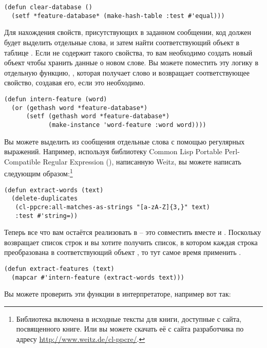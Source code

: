 \begin{lstlisting}
(defun clear-database ()
  (setf *feature-database* (make-hash-table :test #'equal)))
\end{lstlisting}

Для нахождения свойств, присутствующих в заданном сообщении, код должен будет выделить
отдельные слова, и затем найти соответствующий объект  в таблице
.  Если  не содержит такого свойства, то вам
необходимо создать новый объект  чтобы хранить данные о новом слове.  Вы
можете поместить эту логику в отдельную функцию, , которая получает
слово и возвращает соответствующее свойство, создавая его, если это необходимо.

\begin{lstlisting}
(defun intern-feature (word)
  (or (gethash word *feature-database*)
      (setf (gethash word *feature-database*)
            (make-instance 'word-feature :word word))))
\end{lstlisting}

Вы можете выделить из сообщения отдельные слова с помощью регулярных выражений.  Например,
используя библиотеку Common Lisp Portable Perl-Compatible Regular Expression
(), написанную Weitz, вы можете написать  следующим
образом:\footnote{Библиотека  включена в исходные тексты для книги,
  доступные с сайта, посвященного книге.  Или вы можете скачать её с сайта разработчика по
  адресу \url{http://www.weitz.de/cl-ppcre/}.}

\begin{lstlisting}
(defun extract-words (text)
  (delete-duplicates
   (cl-ppcre:all-matches-as-strings "[a-zA-Z]{3,}" text)
   :test #'string=))
\end{lstlisting}

Теперь все что вам остаётся реализовать в  -- это совместить вместе
 и .  Поскольку  возвращает
список строк и вы хотите получить список, в котором каждая строка преобразована в
соответствующий объект , то тут самое время применить .

\begin{lstlisting}
(defun extract-features (text)
  (mapcar #'intern-feature (extract-words text)))
\end{lstlisting}

Вы можете проверить эти функции в интерпретаторе, например вот так:

